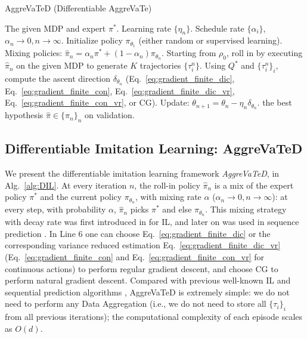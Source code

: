 \documentclass{article}
\begin{document}
\begin{algorithm}[tb]
 \caption{AggreVaTeD (Differentiable AggreVaTe)}
 \begin{algorithmic}[1]
 \label{alg:DIL}
  The given MDP and expert $\pi^*$.  Learning rate $\{\eta_n\}$. Schedule rate $\{\alpha_i\}$, $\alpha_n\to0, n\to\infty$. 
 \STATE Initialize policy $\pi_{\theta_1}$ (either random or supervised learning). 
    \STATE Mixing policies: $\hat{\pi}_n= \alpha_n\pi^* + (1-\alpha_n)\pi_{\theta_n}$.
    \STATE \label{line:rolling_in} Starting from $\rho_0$, roll in by executing $\hat{\pi}_{n}$ on the given MDP to generate $K$ trajectories $\{\tau_i^n\}$.
    \STATE Using $Q^*$ and $\{\tau_i^n\}_i$, compute the ascent direction $\delta_{\theta_n}$ (Eq.~\ref{eq:gradient_finite_dic}, Eq.~\ref{eq:gradient_finite_con},
    Eq.~\ref{eq:gradient_finite_dic_vr}, Eq.~\ref{eq:gradient_finite_con_vr}, or CG).
    \label{line:gradient_compute}
    \STATE Update: $\theta_{n+1} = \theta_n - \eta_n\delta_{\theta_n}$.
\ENDFOR
  the best hypothesis $\hat{\pi}\in\{\pi_n\}_n$ on validation.
 \end{algorithmic}
\end{algorithm}


\subsection{Differentiable Imitation Learning: AggreVaTeD}
We present the differentiable imitation learning framework \emph{AggreVaTeD}, in Alg.~\ref{alg:DIL}. At every iteration $n$, the roll-in policy $\hat{\pi}_n$ is a mix of the expert policy $\pi^*$ and the current policy $\pi_{\theta_n}$, with mixing rate $\alpha$ ($\alpha_n\to0, n\to\infty$): at every step, with probability $\alpha$, $\hat{\pi}_n$ picks $\pi^*$ and else $\pi_{\theta_n}$. This mixing strategy with decay rate was first introduced in \cite{Ross2011_AISTATS} for IL, and later on was used in sequence prediction \cite{bengio2015scheduled}. In Line 6 %
one can choose Eq.~\ref{eq:gradient_finite_dic} or the corresponding variance reduced estimation Eq.~\ref{eq:gradient_finite_dic_vr} (Eq.~\ref{eq:gradient_finite_con} and Eq.~\ref{eq:gradient_finite_con_vr} for continuous actions) to perform regular gradient descent, and choose CG to perform natural gradient descent. Compared with previous well-known IL and sequential prediction algorithms \cite{Ross2011_AISTATS,ross2014reinforcement,chang2015learning}, AggreVaTeD is extremely simple: we do not need to perform any Data Aggregation (i.e., we do not need to store all $\{\tau_i\}_i$ from all previous iterations); the computational complexity of each episode scales as $O(d)$. %
\end{document}
